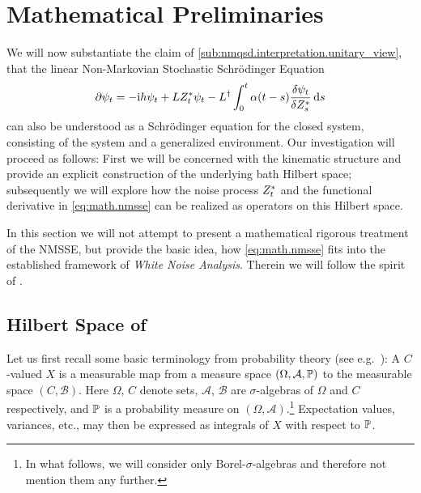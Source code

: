 \chapter{Mathematical Preliminaries}
\label{ch:math}

We will now substantiate the claim of \autoref{sub:nmqsd.interpretation.unitary_view}, that the linear Non-Markovian Stochastic Schrödinger Equation
\begin{equation}
  \partial \psi_t = -\mathrm{i} h \psi_t + L{Z}^*_t \psi_t - L^\dagger\int_0^t \alpha(t-s) \frac{\delta\psi_t}{\delta{Z}^*_s} \, \mathrm{d} s
  \label{eq:math.nmsse}
\end{equation}
can also be understood as a Schrödinger equation for the closed system, consisting of the system and a generalized environment.
Our investigation will proceed as follows: First we will be concerned with the kinematic structure and provide an explicit construction of the underlying bath Hilbert space;
subsequently we will explore how the noise process ${Z}^*_t$ and the functional derivative in \autoref{eq:math.nmsse} can be realized as operators on this Hilbert space.

In this section we will not attempt to present a mathematical rigorous treatment of the NMSSE, but provide the basic idea, how \autoref{eq:math.nmsse} fits into the established framework of \emph{White Noise Analysis}.
Therein we will follow the spirit of \cite{Hi80_brownian_motion,HiKuPoSt93_white_noise}.

\section{Hilbert Space of }
\label{sec:math.hilbert_space}

Let us first recall some basic terminology from probability theory (see e.g.~\cite{Sc05_mims}):
A $C$-valued  $X$ is a measurable map from a measure space $(\Omega, \mathcal{A}, \mathbb{P})$ to the measurable space $(C, \mathcal{B})$.
Here $\Omega$, $C$ denote sets, $\mathcal{A}$, $\mathcal{B}$ are $\sigma$-algebras of $\Omega$ and $C$ respectively, and $\mathbb{P}$ is a probability measure on $(\Omega, \mathcal{A})$.\footnote{In what follows, we will consider only Borel-$\sigma$-algebras and therefore not mention them any further.}
Expectation values, variances, etc., may then be expressed as integrals of $X$ with respect to $\mathbb{P}$.

